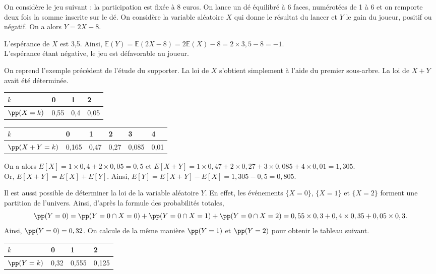 \documentclass[11pt,fleqn, openany]{book} %
\begin{document}
\begin{example} On considère le jeu suivant : la participation est fixée à 8 euros. On lance un dé équilibré à 6 faces, numérotées de 1 à 6 et on remporte deux fois la somme inscrite sur le dé. On considère la variable aléatoire $X$ qui donne le résultat du lancer et $Y$ le gain du joueur, positif ou négatif. On a alors $Y=2X-8$.

L'espérance de $X$ est 3,5. Ainsi, $\mathbb{E}(Y)= \mathbb{E}(2X-8)=2\mathbb{E}(X)-8=2 \times 3,5 - 8 = -1$.\\ L'espérance étant négative, le jeu est défavorable au joueur.\end{example}

\begin{example}On reprend l'exemple précédent de l'étude du supporter. La loi de $X$ s'obtient simplement à l'aide du premier sous-arbre. La loi de $X+Y$ avait été déterminée.

\begin{minipage}{0.35\linewidth}

\renewcommand{\arraystretch}{1.5}
\begin{tabularx}{\linewidth}{|l|X|X|X|}
\hline
$k$ & 0 & 1 & 2  \\
\hline
$\pp(X=k)$ & 0,55 & 0,4 & 0,05  \\
\hline
\end{tabularx}
\end{minipage}\hfill\begin{minipage}{0.6\linewidth}
\renewcommand{\arraystretch}{1.5}
\begin{tabularx}{\linewidth}{|l|X|X|X|X|X|}
\hline
$k$ & 0 & 1 & 2 & 3 & 4 \\
\hline
$\pp(X+Y=k)$ & 0,165 & 0,47 & 0,27 & 0,085&0,01 \\
\hline
\end{tabularx}

\end{minipage}

On a alors $E[X]= 1 \times 0,4 + 2 \times 0,05 = 0,5$ et $E[X+Y]= 1 \times 0,47 + 2 \times 0,27+3 \times 0,085+4 \times 0,01=1,305$.\\
Or, $E[X+Y]=E[X]+E[Y]$. Ainsi, $E[Y]=E[X+Y]-E[X]=1,305-0,5=0,805$.

Il est aussi possible de déterminer la loi de la variable aléatoire $Y$. En effet, les événements $\{X=0\}$, $\{X=1\}$ et $\{X=2\}$ forment une partition de l'univers. Ainsi, d'après la formule des probabilités totales,
\[\pp(Y=0)=\pp(Y=0 \cap X=0)+\pp(Y=0 \cap X=1)+\pp(Y=0\cap X=2)=0,55 \times 0,3 + 0,4 \times 0,35 + 0,05 \times 0,3.\]
Ainsi, $\pp(Y=0)=0,32$. On calcule de la même manière $\pp(Y=1)$ et $\pp(Y=2)$ pour obtenir le tableau suivant.
\begin{center}
\renewcommand{\arraystretch}{1.5}
\begin{tabularx}{0.6\linewidth}{|l|X|X|X|}
\hline
$k$ & 0 & 1 & 2  \\
\hline
$\pp(Y=k)$ & 0,32 & 0,555 & 0,125  \\
\hline
\end{tabularx}
\end{center}


\end{example}
\end{document}
